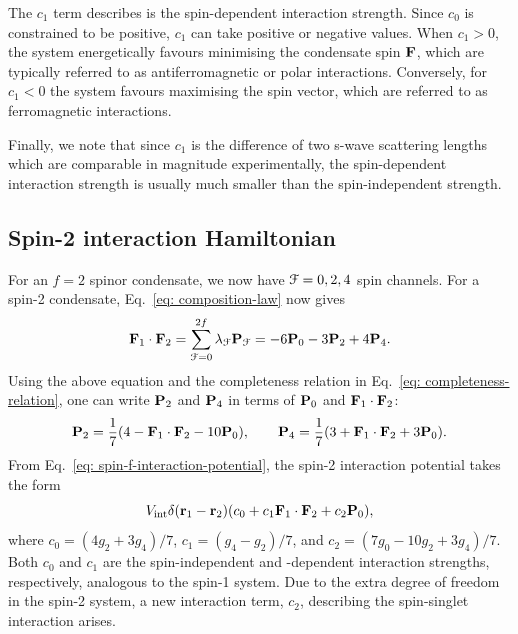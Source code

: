 The \(c_1\) term describes is the spin-dependent interaction strength.
Since \(c_0\) is constrained to be positive, \(c_1\) can take positive or
negative values.
When \(c_1 > 0\), the system energetically favours minimising the condensate
spin \(\vb{F}\), which are typically referred to as antiferromagnetic or polar
interactions.
Conversely, for \(c_1 < 0\) the system favours maximising the spin vector,
which are referred to as ferromagnetic interactions.

Finally, we note that since \(c_1\) is the difference of two s-wave scattering
lengths which are comparable in magnitude experimentally, the spin-dependent
interaction strength is usually much smaller than the spin-independent strength.

\subsection{Spin-2 interaction Hamiltonian}
For an \(f=2\) spinor condensate, we now have \(\EuScript{F}=0,2,4\) spin
channels.
For a spin-2 condensate, Eq.~\eqref{eq: composition-law} now gives
\begin{equation}
    \vb{F}_1 \cdot \vb{F}_2 = \sum_{\EuScript{F} = 0}^{2f}
    \lambda_\EuScript{F}\vb{P}_\EuScript{F} = -6\vb{P}_0-3\vb{P}_2+4\vb{P}_4.
\end{equation}
Using the above equation and the completeness relation in
Eq.~\eqref{eq: completeness-relation}, one can write \(\vb{P}_2\) and
\(\vb{P}_4\) in terms of \(\vb{P}_0\) and \(\vb{F}_1 \cdot \vb{F}_2\):
\begin{equation}
    \vb{P}_2 = \frac{1}{7}(4 - \vb{F}_1 \cdot \vb{F}_2 - 10\vb{P}_0), \qquad
    \vb{P}_4 = \frac{1}{7}(3 + \vb{F}_1 \cdot \vb{F}_2 + 3\vb{P}_0).
\end{equation}
From Eq.~\eqref{eq: spin-f-interaction-potential}, the spin-2 interaction
potential takes the form
\begin{equation}
    V_\mathrm{int}\delta(\vb{r}_1-\vb{r}_2)(c_0+c_1\vb{F}_1 \cdot \vb{F}_2
    +c_2\vb{P}_0),
\end{equation}
where \(c_0=(4g_2+3g_4)/7\), \(c_1=(g_4-g_2)/7\), and
\(c_2=(7g_0-10g_2+3g_4)/7\).
Both \(c_0\) and \(c_1\) are the spin-independent and -dependent interaction
strengths, respectively, analogous to the spin-1 system.
Due to the extra degree of freedom in the spin-2 system, a new interaction term,
\(c_2\), describing the spin-singlet interaction arises.

